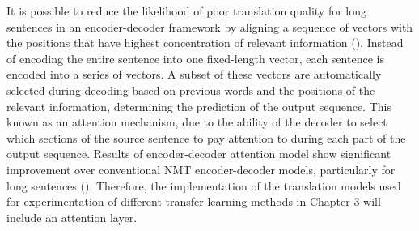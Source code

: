 It is possible to reduce the likelihood of poor translation quality for long sentences in an encoder-decoder framework by aligning a sequence of vectors with the positions that have highest concentration of relevant information (\cite{bahdanau_neural_2016}). 
Instead of encoding the entire sentence into one fixed-length vector, each sentence is encoded into a series of vectors. A subset of these vectors are automatically selected during decoding based on previous words and the positions of the relevant information, determining the prediction of the output sequence. This known as an attention mechanism, due to the ability of the decoder to select which sections of the source sentence to pay attention to during each part of the output sequence. Results of encoder-decoder attention model show significant improvement over conventional \acrshort{NMT} encoder-decoder models, particularly for long sentences (\cite{luong_effective_2015}). Therefore, the implementation of the translation models used for experimentation of different transfer learning methods in Chapter 3 will include an attention layer.

















